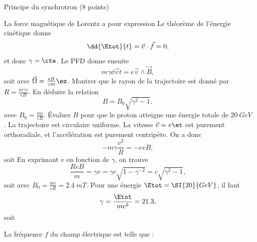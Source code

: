 \begin{exo}[PC][2][devoir]{Principe du synchrotron (8 points)}
\begin{quest}
{    }
    {
        La force magnétique de Lorentz a pour expression 
        Le théorème de l’énergie cinétique donne 
        $$
        \dd{\Etot}{t} = \Vec{v}\cdot \Vec{f}  = 0,
        $$
        et donc $\gamma= \cte$. Le PFD donne ensuite 
        $$
        m \gamma \dd{\Vec{v}}{t} = e \Vec{v} \wedge \Vec{B},
        $$
        soit 
        avec $\Vec{\Omega} = \frac{e B}{\gamma m} \ez$.
    }
    \QR  
   { Montrer que le rayon de la trajectoire est donné par 
        $R = \frac{m \gamma v}{e B}.$
    En déduire la relation 
    \begin{equation}
        B = B_0\sqrt{\gamma^2 -1},
    \end{equation}
    avec $B_0 = \frac{m c}{e R}$.
    Évaluer  $B$ pour que le proton atteigne une énergie totale de $\SI{20}{GeV}$.}
    {
    La trajectoire est circulaire uniforme. La vitesse $\Vec{v} = v \et$ est purement orthoradiale, et l’accélération est purement centripète. On a donc 
    $$
    -m\gamma \frac{v^2}{R} = - e v B,
    $$
    soit 
    En exprimant $v$ en fonction de $\gamma$, on trouve 
    $$
\frac{ReB}{m} = \gamma v = \gamma c \sqrt{ 1-\gamma^{-2} } = c \sqrt{\gamma^2 -1 },
    $$
    soit 
    avec $B_0 = \frac{m c}{e R} = \SI{2.4}{mT}$. Pour une énergie $\Etot = \SI{20}{GeV}$, il faut 
    $$
    \gamma = \frac{\Etot}{mc^2} = 21.3,
    $$
    soit 
    }
        
    {
        La fréquence $f$ du champ électrique est telle que :

}
\end{quest}
\end{exo}
